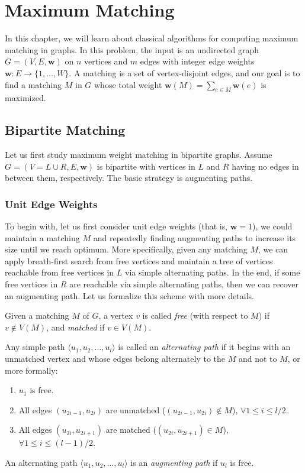 \newcommand{\wts}{\mathbf{w}}

\chapter{Maximum Matching}
In this chapter, we will learn about classical algorithms for computing maximum matching in graphs. In this problem, the input is an undirected graph $G = (V, E, \wts)$ on $n$ vertices and $m$ edges with integer edge weights $\wts: E\rightarrow \{1, \ldots, W\}$. A matching is a set of vertex-disjoint edges, and our goal is to find a matching $M$ in $G$ whose total weight $\wts(M) = \sum_{e\in M}\wts(e)$ is maximized.


\section{Bipartite Matching}
Let us first study maximum weight matching in bipartite graphs. Assume $G = (V = L\cup R, E, \wts)$ is bipartite with vertices in $L$ and $R$ having no edges in between them, respectively. The basic strategy is augmenting paths. 

\subsection{Unit Edge Weights}

To begin with, let us first consider unit edge weights (that is, $\wts= 1$), we could maintain a matching $M$ and repeatedly finding augmenting paths to increase its size until we reach optimum. More specifically, given any matching $M$, we can apply breath-first search from free vertices and maintain a tree of vertices reachable from free vertices in $L$ via simple alternating paths. In the end, if some free vertices in $R$ are reachable via simple alternating paths, then we can recover an augmenting path. Let us formalize this scheme with more details.

\begin{definition}
	Given a matching $M$ of $G$, a vertex $v$ is called \emph{free} (with respect to $M$) if $v\notin V(M)$, and \emph{matched} if $v\in V(M)$.
	
	Any simple path $\langle u_1, u_2, \ldots, u_l\rangle$ is called an \emph{alternating path} if it begins with an unmatched vertex and whose edges belong alternately to the $M$ and not to $M$, or more formally:
	\begin{enumerate}
	\item $u_1$ is free.
	\item All edges $(u_{2i-1}, u_{2i})$ are unmatched ($(u_{2i-1}, u_{2i})\notin M$), $\forall 1\leq i\leq l/2$.
	\item All edges $(u_{2i}, u_{2i+1})$ are matched ($(u_{2i}, u_{2i+1})\in M$), $\forall 1\leq i\leq (l-1)/2$.
	\end{enumerate}
	An alternating path $\langle u_1, u_2, \ldots, u_l\rangle$ is an \emph{augmenting path} if $u_l$ is free.
\end{definition}

